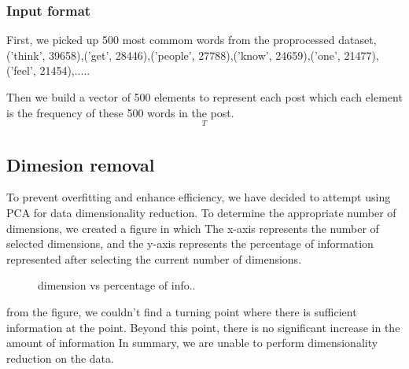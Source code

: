 \documentclass{article}
\begin{document}
\subsubsection{Input format}
First, we picked up 500 most commom words from the proprocessed dataset,
\\
('think', 39658),('get', 28446),('people', 27788),('know', 24659),('one', 21477),('feel', 21454),.....

Then we build a vector of 500 elements to represent each post which each element is the frequency of these 500 words in the post.
\begin{equation}
 [f_0,f_1,...,f_{499}]^T
\end{equation}

\subsection{Dimesion removal}
To prevent overfitting and enhance efficiency, we have decided to attempt using PCA for data dimensionality reduction.
To determine the appropriate number of dimensions, we created a figure in which 
The x-axis represents the number of selected dimensions, and the y-axis represents the percentage of information represented after selecting the current number of dimensions.
\begin{figure}
  \centering
  \caption{ dimension vs percentage of info..}
\end{figure}
from the figure, we couldn't find a turning point where there is sufficient information at the point. Beyond this point, there is no significant increase in the amount of information
In summary, we are unable to perform dimensionality reduction on the data.
\end{document}
